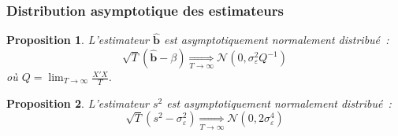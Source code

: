 \documentclass[10pt]{beamer}
\theoremstyle{plain}
\newtheorem{prop}{Proposition}
\begin{document}
\begin{frame}
  \frametitle{Distribution asymptotique des estimateurs}

  \begin{prop}\label{prop:asymptotic_dist:bhat}
    L'estimateur $\hat{\mathbf b}$ est asymptotiquement normalement distribué~:
    \[
      \sqrt{T}\left( \hat{\mathbf b} - \beta\right) \underset{T\to\infty}{\Longrightarrow} \mathcal N\left( 0, \sigma_{\varepsilon}^2 Q^{-1}\right)
    \]
    où $Q = \lim_{T\to\infty}\frac{X'X}{T}$.
  \end{prop}

  \bigskip

  \begin{prop}\label{prop:asymptotic_dist:s2}
    L'estimateur $s^2$ est asymptotiquement normalement distribué~:
    \[
      \sqrt{T}\left( s^2 - \sigma_{\varepsilon}^2\right) \underset{T\to\infty}{\Longrightarrow} \mathcal N\left( 0, 2\sigma_{\varepsilon}^4\right)
    \]
  \end{prop}

\end{frame}
\end{document}
